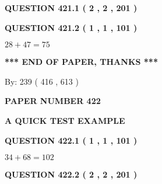\documentclass[12pt]{article}
\begin{document}
\vspace{0.2in}
  
{\textbf{\Large{QUESTION
421.1 
 ( 2 , 2 , 201 )
}}}
  
  
  
\vspace{0.2in}
  
{\textbf{\Large{QUESTION
421.2 
 ( 1 , 1 , 101 )
}}}
  
  
 
 

$ %
28 +  %
47=   %
75$
 
 
   
   
 \vspace{0.2in}
 
   
   
   
   
\vspace{1.0in} 
{\textbf{\large{ *** END OF PAPER, THANKS *** }}} 
   
   
\hspace{1.0in} By: 
 239 ( 416 ,  613 )
   
   
   
   
\newpage 
\setcounter{page}{ 
   422001 } 
   
   
   
   
 {\textbf{ \Large{ PAPER NUMBER  422  }}}
   
   
\vspace{0.2in}
   
   
   
   
   
   
 \vspace{0.2in}
{\LARGE {\textbf{ A QUICK TEST EXAMPLE}}}
   
   
  
\vspace{0.2in}
  
{\textbf{\Large{QUESTION
422.1 
 ( 1 , 1 , 101 )
}}}
  
  
 
 

$ %
34 +  %
68=   %
102$
 
 
  
\vspace{0.2in}
  
{\textbf{\Large{QUESTION
422.2 
 ( 2 , 2 , 201 )
}}}
  
  
   
   
 \vspace{0.2in}
 
\end{document}

